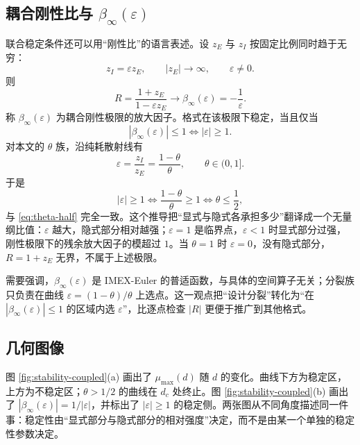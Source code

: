 \subsection{耦合刚性比与 \texorpdfstring{$\beta_\infty(\varepsilon)$}{beta-inf}}

联合稳定条件还可以用“刚性比”的语言表述。设 $z_E$ 与 $z_I$ 按固定比例同时趋于无穷：
\begin{equation}
  z_I=\varepsilon z_E,\qquad |z_E|\to\infty,\qquad \varepsilon\ne0.
  \label{eq:epsilon-def}
\end{equation}
则
\begin{equation}
  R=\frac{1+z_E}{1-\varepsilon z_E}
  \longrightarrow
  \beta_\infty(\varepsilon)=-\frac{1}{\varepsilon}.
  \label{eq:beta-infinity}
\end{equation}
称 $\beta_\infty(\varepsilon)$ 为耦合刚性极限的放大因子。格式在该极限下稳定，当且仅当
\begin{equation}
  |\beta_\infty(\varepsilon)|\le1
  \iff
  |\varepsilon|\ge1.
  \label{eq:epsilon-stable}
\end{equation}
对本文的 $\theta$ 族，沿纯耗散射线有
\begin{equation}
  \varepsilon=\frac{z_I}{z_E}=\frac{1-\theta}{\theta},
  \qquad \theta\in(0,1].
  \label{eq:epsilon-theta}
\end{equation}
于是
\begin{equation}
  |\varepsilon|\ge1
  \iff
  \frac{1-\theta}{\theta}\ge1
  \iff
  \theta\le\frac12,
  \label{eq:epsilon-half}
\end{equation}
与 \eqref{eq:theta-half} 完全一致。这个推导把“显式与隐式各承担多少”翻译成一个无量纲比值：$\varepsilon$ 越大，隐式部分相对越强；$\varepsilon=1$ 是临界点，$\varepsilon<1$ 时显式部分过强，刚性极限下的残余放大因子的模超过 $1$。当 $\theta=1$ 时 $\varepsilon=0$，没有隐式部分，$R=1+z_E$ 无界，不属于上述极限。

需要强调，$\beta_\infty(\varepsilon)$ 是 IMEX-Euler 的普适函数，与具体的空间算子无关；分裂族只负责在曲线 $\varepsilon=(1-\theta)/\theta$ 上选点。这一观点把“设计分裂”转化为“在 $|\beta_\infty(\varepsilon)|\le1$ 的区域内选 $\varepsilon$”，比逐点检查 $|R|$ 更便于推广到其他格式。

\subsection{几何图像}

图 \ref{fig:stability-coupled}(a) 画出了 $\mu_{\max}(d)$ 随 $d$ 的变化。曲线下方为稳定区，上方为不稳定区；$\theta>1/2$ 的曲线在 $d_c$ 处终止。图 \ref{fig:stability-coupled}(b) 画出了 $|\beta_\infty(\varepsilon)|=1/|\varepsilon|$，并标出了 $|\varepsilon|\ge1$ 的稳定侧。两张图从不同角度描述同一件事：稳定性由“显式部分与隐式部分的相对强度”决定，而不是由某一个单独的稳定性参数决定。

